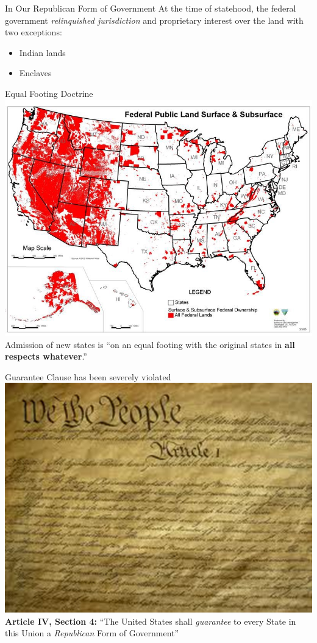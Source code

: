 \begin{frame}
    \begin{block}{In Our Republican Form of Government}
        At the time of statehood, the federal government \emph{relinquished jurisdiction} and proprietary interest over the land with two exceptions:
        \begin{itemize}
            \item Indian lands
            \item Enclaves
        \end{itemize}
    \end{block}
\end{frame}

\begin{frame}{Equal Footing Doctrine}
    \centering
    \includegraphics[width=.7\textwidth]{img/federal-lands.png} \\
    \Large{Admission of new states is ``on an equal footing with the original states in \textbf{all respects whatever}.''} \\
\end{frame}

\begin{frame}{Guarantee Clause has been severely violated}
    \centering
    \includegraphics[height=.7\textheight]{img/constitution.png} \\
    \textbf{Article IV, Section 4:} ``The United States shall \emph{guarantee} to every State in this Union a \emph{Republican} Form of Government''
\end{frame}

